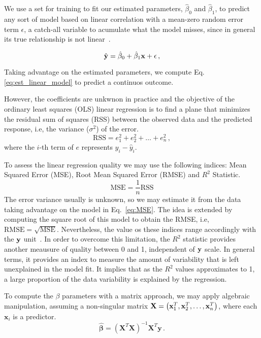 We use a set for training to fit our estimated parameters, $\hat{\beta}_{0}$ and $\hat{\beta}_{1}$, to predict any sort of model based on linear correlation with a mean-zero random error term $\epsilon$, a catch-all variable to acumulate what the model misses, since in general its true relationship is not linear~\cite{James2013}.

\begin{equation}
\hat{{\bf y}} = \hat{\beta}_{0} + \hat{\beta}_{1} {\bf x} + {\bf \epsilon} \, ,
\label{eq:est_linear_model}
\end{equation}

Taking advantage on the estimated parameters, we compute Eq. \ref{eq:est_linear_model} to predict a continuos outcome. 

However, the coefficients are unkwnon in practice and the objective of the ordinary least squares (OLS) linear regression is to find a plane that minimizes the residual sum of squares (RSS) between the observed data and the predicted response, i.e, the variance ($\sigma^2$) of the error.     
\begin{equation}
  \text{RSS} = e_1^2 + e_2^2 + \dots + e_n^2 \, , \label{eq:RSS}
\end{equation}
where the $i$-th term of $e$ represents $y_i - \hat{y}_i$.

To assess the linear regression quality we may use the following indices: Mean Squared Error (MSE), Root Mean Squared Error (RMSE) and $R^2$ Statistic.
\begin{equation}
  \text{MSE} = \frac{1}{n} \text{RSS}
  \label{eq:MSE}
\end{equation}
The error variance usually is unknown, so we may estimate it from the data taking advantage on the model in Eq.~\ref{eq:MSE}. The idea is extended by computing the square root of this model to obtain the RMSE, i.e, $\text{RMSE} = \sqrt{\text{MSE}}$. Nevertheless, the value os these indices range accordingly with the ${\bf y}$ unit~\cite{Kuhn2013}. In order to overcome this limitation, the $R^2$ statistic provides another meausure of quality between 0 and 1, independent of ${\bf y}$ scale. In general terms, it provides an index to measure the amount of variability that is left unexplained in the model fit. It implies that as the $R^2$ values approximates to 1, a large proportion of the data variability is explained by the regression.

To compute the $\beta$ parameters with a matrix approach, we may apply algebraic manipulation, assuming a non-singular matrix ${\bf X} = \left( \mathbf{x}_1^T, \mathbf{x}_2^T, \dots,\mathbf{x}_n^T \right)$, where each $\mathbf{x}_i$ is a predictor. 
\begin{equation}
\mathbf{\hat{\boldsymbol{\beta}}} = \left( \mathbf{X}^T\mathbf{X}  \right)^{-1}\mathbf{X}^T \mathbf{y} \, . \label{eq:betas}
\end{equation}

